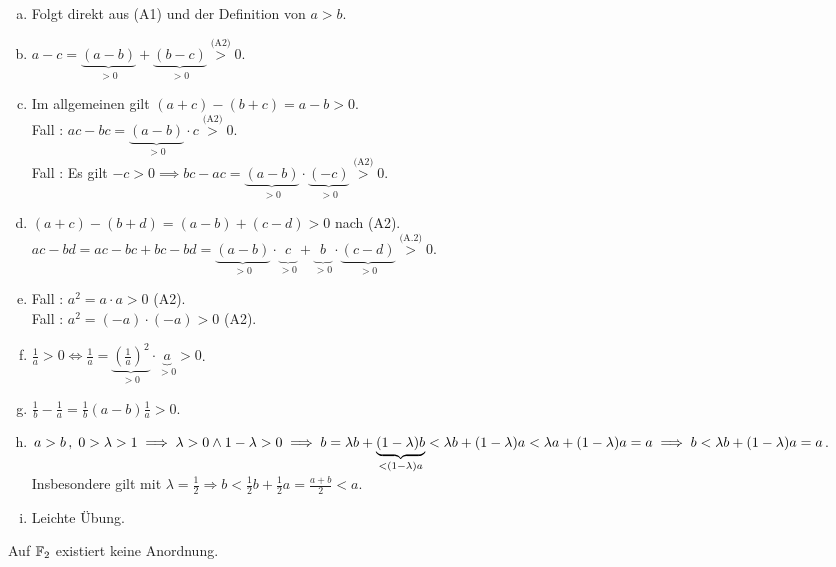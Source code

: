 \documentclass[../ana1.tex]{subfiles}
\begin{document}
\begin{bew}\leavevmode
	\begin{enumerate}[(a)]
		\item Folgt direkt aus (A1) und der Definition von \(a > b\).
		\item \(a - c = \underbrace{(a - b)}_{> 0} + \underbrace{(b - c)}_{> 0} \overset{\text{(A2)}}{>} 0\).
		\item Im allgemeinen gilt \((a + c) - (b + c) = a - b > 0\).\\
			  Fall : \(ac - bc = \underbrace{(a - b)}_{> 0} \cdot c \overset{\text{(A2)}}{>}0\).\\
			  Fall : Es gilt \(\minus c > 0 \implies bc - ac = \underbrace{(a - b)}_{> 0} \cdot \underbrace{(\minus c)}_{> 0} \overset{\text{(A2)}}{>} 0\).
		\item \((a+c)-(b+d) = (a-b)+(c-d)>0\) nach (A2).\\
		      \(ac-bd=ac-bc+bc-bd=\underbrace{(a-b)}_{>0} \cdot \underbrace{\phantom{(}c\phantom{)}}_{>0} + \underbrace{\phantom{(}b\phantom{)}}_{>0} \cdot \underbrace{(c-d)}_{>0} \overset{\text{(A.2)}}{>}0\).
		\item Fall : \(a^2 = a\cdot a > 0\) (A2).\\
			  Fall : \(a^2 = (-a)\cdot(-a) > 0\) (A2).
		\item \(\frac{1}{a} > 0 \iff \frac{1}{a} = \underbrace{\left(\frac{1}{a}\right)^2}_{>0} \cdot \underbrace{a}_{>0} > 0\).
		\item \(\frac{1}{b} - \frac{1}{a} = \frac{1}{b}(a - b)\frac{1}{a} > 0\).
		\item \(a > b\operatorname{,} \; 0 > \lambda > 1 \implies \lambda > 0 \wedge 1 - \lambda > 0\\
			  \implies b = \lambda b + \underbrace{(1 - \lambda)b}_{< (1 - \lambda)a} < \lambda b + (1 - \lambda) a < \lambda a + (1 - \lambda)a = a\\
			  \implies b < \lambda b + (1 - \lambda)a = a\).\\
			  Insbesondere gilt mit \(\lambda = \frac{1}{2} \Rightarrow b < \frac{1}{2} b + \frac{1}{2}a = \frac{a + b}{2} < a\).
		\item Leichte Übung.\qedhere
	\end{enumerate}
\end{bew}

\begin{bem}
	Auf \(\mathbb{F}_2\) existiert keine Anordnung.
\end{bem}
\end{document}
